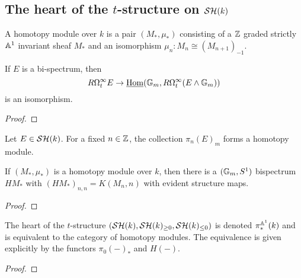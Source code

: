 \documentclass{amsart}%
\begin{document}
\subsection{The heart of the $t$-structure on $\mathcal{SH}(k)$}

\begin{definition}
  A homotopy module over $k$ is a pair $(M_*, \mu_*)$ consisting of a
  $\mathbb{Z}$ graded strictly $\mathbb{A}^1$ invariant sheaf $M_*$ and an
  isomorphism $\mu_n : M_n \cong (M_{n+1})_{-1}$. 
\end{definition}

\begin{lemma}
  If $E$ is a bi-spectrum, then 
  \begin{equation*}
    R\Omega^{\infty}_t E \to \underline{\operatorname{Hom}}(\mathbb{G}_m, R\Omega^{\infty}_t(E\wedge \mathbb{G}_m))
  \end{equation*}
  is an isomorphism.
\end{lemma}

\begin{proof}
  
\end{proof}

\begin{lemma}
  Let $E \in \mathcal{SH}(k)$. For a fixed $n\in\mathbb{Z}$, the collection
  $\pi_{n}(E)_{m}$ forms a homotopy module.
\end{lemma}

\begin{lemma}
  If $(M_*, \mu_*)$ is a homotopy module over $k$, then there is a
  $(\mathbb{G}_m, S^1)$ bispectrum $HM_*$ with $(HM_*)_{n,n} = K(M_n,n)$
  with evident structure maps. 
\end{lemma}

\begin{proof}
  
\end{proof}

\begin{theorem}
  The heart of the $t$-structure
  $(\mathcal{SH}(k), \mathcal{SH}(k)_{\geq 0}, \mathcal{SH}(k)_{\leq 0})$ is denoted
  $\pi^{\mathbb{A}^1}_*(k)$ and is equivalent to the category of homotopy
  modules. The equivalence is given explicitly by the functors
  $\pi_0(-)_*$ and $H(-)$. 
\end{theorem}

\begin{proof}
  
\end{proof}
\end{document}

